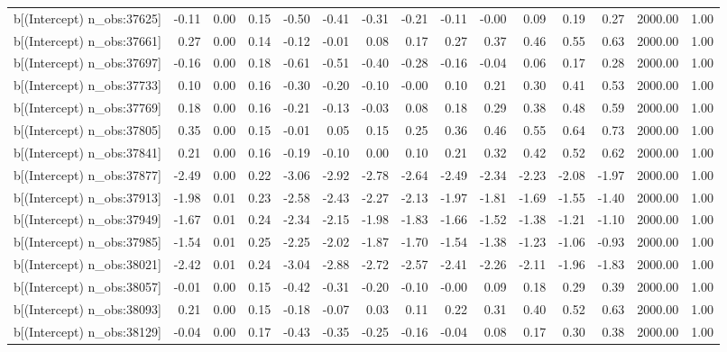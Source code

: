 \begin{table}[ht]
\begin{tabular}{rrrrrrrrrrrrrrr}
  b[(Intercept) n\_obs:37625] & -0.11 & 0.00 & 0.15 & -0.50 & -0.41 & -0.31 & -0.21 & -0.11 & -0.00 & 0.09 & 0.19 & 0.27 & 2000.00 & 1.00 \\ 
  b[(Intercept) n\_obs:37661] & 0.27 & 0.00 & 0.14 & -0.12 & -0.01 & 0.08 & 0.17 & 0.27 & 0.37 & 0.46 & 0.55 & 0.63 & 2000.00 & 1.00 \\ 
  b[(Intercept) n\_obs:37697] & -0.16 & 0.00 & 0.18 & -0.61 & -0.51 & -0.40 & -0.28 & -0.16 & -0.04 & 0.06 & 0.17 & 0.28 & 2000.00 & 1.00 \\ 
  b[(Intercept) n\_obs:37733] & 0.10 & 0.00 & 0.16 & -0.30 & -0.20 & -0.10 & -0.00 & 0.10 & 0.21 & 0.30 & 0.41 & 0.53 & 2000.00 & 1.00 \\ 
  b[(Intercept) n\_obs:37769] & 0.18 & 0.00 & 0.16 & -0.21 & -0.13 & -0.03 & 0.08 & 0.18 & 0.29 & 0.38 & 0.48 & 0.59 & 2000.00 & 1.00 \\ 
  b[(Intercept) n\_obs:37805] & 0.35 & 0.00 & 0.15 & -0.01 & 0.05 & 0.15 & 0.25 & 0.36 & 0.46 & 0.55 & 0.64 & 0.73 & 2000.00 & 1.00 \\ 
  b[(Intercept) n\_obs:37841] & 0.21 & 0.00 & 0.16 & -0.19 & -0.10 & 0.00 & 0.10 & 0.21 & 0.32 & 0.42 & 0.52 & 0.62 & 2000.00 & 1.00 \\ 
  b[(Intercept) n\_obs:37877] & -2.49 & 0.00 & 0.22 & -3.06 & -2.92 & -2.78 & -2.64 & -2.49 & -2.34 & -2.23 & -2.08 & -1.97 & 2000.00 & 1.00 \\ 
  b[(Intercept) n\_obs:37913] & -1.98 & 0.01 & 0.23 & -2.58 & -2.43 & -2.27 & -2.13 & -1.97 & -1.81 & -1.69 & -1.55 & -1.40 & 2000.00 & 1.00 \\ 
  b[(Intercept) n\_obs:37949] & -1.67 & 0.01 & 0.24 & -2.34 & -2.15 & -1.98 & -1.83 & -1.66 & -1.52 & -1.38 & -1.21 & -1.10 & 2000.00 & 1.00 \\ 
  b[(Intercept) n\_obs:37985] & -1.54 & 0.01 & 0.25 & -2.25 & -2.02 & -1.87 & -1.70 & -1.54 & -1.38 & -1.23 & -1.06 & -0.93 & 2000.00 & 1.00 \\ 
  b[(Intercept) n\_obs:38021] & -2.42 & 0.01 & 0.24 & -3.04 & -2.88 & -2.72 & -2.57 & -2.41 & -2.26 & -2.11 & -1.96 & -1.83 & 2000.00 & 1.00 \\ 
  b[(Intercept) n\_obs:38057] & -0.01 & 0.00 & 0.15 & -0.42 & -0.31 & -0.20 & -0.10 & -0.00 & 0.09 & 0.18 & 0.29 & 0.39 & 2000.00 & 1.00 \\ 
  b[(Intercept) n\_obs:38093] & 0.21 & 0.00 & 0.15 & -0.18 & -0.07 & 0.03 & 0.11 & 0.22 & 0.31 & 0.40 & 0.52 & 0.63 & 2000.00 & 1.00 \\ 
  b[(Intercept) n\_obs:38129] & -0.04 & 0.00 & 0.17 & -0.43 & -0.35 & -0.25 & -0.16 & -0.04 & 0.08 & 0.17 & 0.30 & 0.38 & 2000.00 & 1.00 \\ 

\end{tabular}
\end{table}
